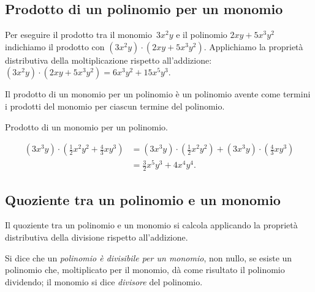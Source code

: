 
\subsection{Prodotto di un polinomio per un monomio}
\label{subsec:10_poli_prodottopermonomio}

Per eseguire il prodotto tra il monomio~$3x^{2}y$ e il polinomio
$2{xy}+5x^{3}y^{2}$ indichiamo il prodotto con
$\left(3x^{2}y\right)\cdot \left(2{xy}+5x^{3}y^{2}\right)$.
Applichiamo la proprietà distributiva della moltiplicazione rispetto
all'addizione:~$\left(3x^{2}y\right)\cdot
\left(2{xy}+5x^{3}y^{2}\right)=6x^{3}y^{2}+15x^{5}y^{3}$.

\osservazione Il prodotto di un monomio per un polinomio è
un polinomio avente come termini i prodotti del monomio per ciascun
termine del polinomio.

\begin{exrig}
 \begin{esempio}
 Prodotto di un monomio per un polinomio.

 \begin{equation*}
\begin{split}
\left(3x^{3}y\right)\cdot\left(\frac{1}{2}x^{2}y^{2}+\frac{4}{3}{xy}^{3}
\right)&=\left(3x^{3}y\right)\cdot\left(\frac{1}{2}x^{2}y^{2}
\right)+\left(3x^{3}y\right)\cdot%
\left(\frac{4}{3}{xy}^{3}\right)\\
&=\frac{3}{2}x^{5}y^{3}+4x^{4}y^{4}.
\end{split}
\end{equation*}
 \end{esempio}
\end{exrig}


\subsection{Quoziente tra un polinomio e un monomio}
\label{subsec:10_poli_quozientepermonomio}

Il quoziente tra un polinomio e un monomio si calcola applicando la
proprietà distributiva della divisione rispetto
all'addizione.

\begin{definizione}
 Si dice che un \emph{polinomio è divisibile per un monomio}, non
nullo, se esiste un polinomio che, moltiplicato per il monomio, dà
come risultato il polinomio dividendo; il monomio si dice
\emph{divisore} del polinomio.
\end{definizione}

